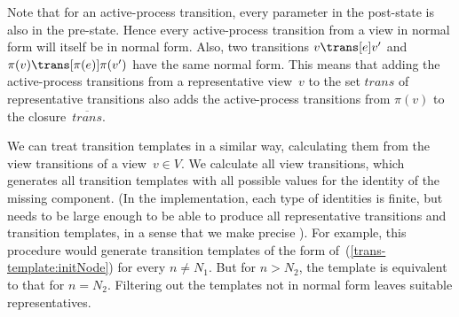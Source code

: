 Note that for an active-process transition, every parameter in the post-state
is also in the pre-state.  Hence every active-process transition from a view
in normal form will itself be in normal form.  Also, two transitions $v
\trans[e] v'$ and $\pi(v) \trans[\pi(e)] \pi(v')$ have the same normal form.
This means that adding the active-process transitions from a representative
view~$v$ to the set $trans$ of representative transitions also adds the
active-process transitions from $\pi(v)$ to the closure~$\overline{trans}$.

We can treat transition templates in a similar way, calculating them from the
view transitions of a view~$v \in V$.  We calculate all view transitions,
which generates all transition templates with all possible values for the
identity of the missing component.  (In the implementation, each type of
identities is finite, but needs to be large enough to be able to produce all
representative transitions and transition templates, in a sense that we make
precise ).  For example, this procedure would generate
transition templates of the form of~(\ref{trans-template:initNode}) for every
$n \ne N_1$.  But for $n > N_2$, the template is equivalent to that for $n =
N_2$.  Filtering out the templates not in normal form leaves suitable
representatives.







